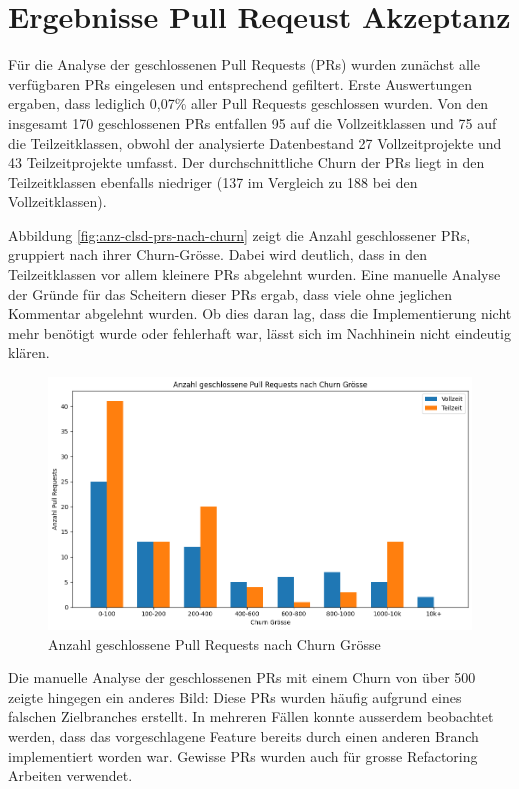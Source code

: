 \section{Ergebnisse Pull Reqeust Akzeptanz}
Für die Analyse der geschlossenen Pull Requests (PRs) wurden zunächst alle verfügbaren PRs eingelesen und entsprechend gefiltert. Erste Auswertungen ergaben, dass lediglich 0,07\% aller Pull Requests geschlossen wurden. Von den insgesamt 170 geschlossenen PRs entfallen 95 auf die Vollzeitklassen und 75 auf die Teilzeitklassen, obwohl der analysierte Datenbestand 27 Vollzeitprojekte und 43 Teilzeitprojekte umfasst. Der durchschnittliche Churn der PRs liegt in den Teilzeitklassen ebenfalls niedriger (137 im Vergleich zu 188 bei den Vollzeitklassen).

Abbildung \autoref{fig:anz-clsd-prs-nach-churn} zeigt die Anzahl geschlossener PRs, gruppiert nach ihrer Churn-Grösse. Dabei wird deutlich, dass in den Teilzeitklassen vor allem kleinere PRs abgelehnt wurden. Eine manuelle Analyse der Gründe für das Scheitern dieser PRs ergab, dass viele ohne jeglichen Kommentar abgelehnt wurden. Ob dies daran lag, dass die Implementierung nicht mehr benötigt wurde oder fehlerhaft war, lässt sich im Nachhinein nicht eindeutig klären.

\begin{figure}[htbp]
    \includegraphics[width=\textwidth]{Figures/anzahl-geschlossene-prs-nach-churn.png}
    \caption{Anzahl geschlossene Pull Requests nach Churn Grösse}
    \label{fig:anz-clsd-prs-nach-churn}
\end{figure}


Die manuelle Analyse der geschlossenen PRs mit einem Churn von über 500 zeigte hingegen ein anderes Bild: Diese PRs wurden häufig aufgrund eines falschen Zielbranches erstellt. In mehreren Fällen konnte ausserdem beobachtet werden, dass das vorgeschlagene Feature bereits durch einen anderen Branch implementiert worden war. Gewisse PRs wurden auch für grosse Refactoring Arbeiten verwendet. 

